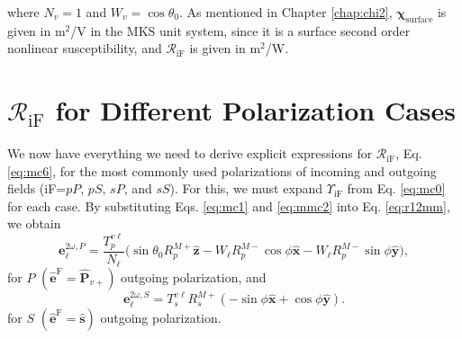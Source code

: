 where $N_{v}=1$ and $W_{v}=\cos\theta_{0}$. As mentioned in Chapter
\eqref{chap:chi2}, $\boldsymbol{\chi}_{\mathrm{surface}}$ is given in m$^{2}$/V
in the MKS unit system, since it is a surface second order nonlinear
susceptibility, and $\mathcal{R}_{\mathrm{iF}}$ is given in m$^2$/W.



\section{\texorpdfstring{$\mathcal{R}_{\mathrm{iF}}$}{R} for Different
Polarization Cases}\label{sec:rcases}

We now have everything we need to derive explicit expressions for
$\mathcal{R}_{\mathrm{iF}}$, Eq. \eqref{eq:mc6}, for the most commonly used
polarizations of incoming and outgoing fields (iF=$pP$, $pS$, $sP$, and $sS$).
For this, we must expand $\Upsilon_{\mathrm{iF}}$ from Eq. \eqref{eq:mc0} for
each case. By substituting Eqs. \eqref{eq:mc1} and \eqref{eq:mmc2} into Eq.
\eqref{eq:r12mm}, we obtain
\begin{equation}\label{eq:e2wpmr}
\mathbf{e}^{2\omega,P}_{\ell} =
\frac{T^{v\ell}_{p}}{N_{\ell}}
\big(
  \sin\theta_{0}R^{M+}_{p}\hat{\mathbf{z}}
- W_{\ell}R^{M-}_{p}\cos\phi\hat{\mathbf{x}}
- W_{\ell}R^{M-}_{p}\sin\phi\hat{\mathbf{y}}
\big),
\end{equation}
for $P$ $(\hat{\mathbf{e}}^{\mathrm{F}} = \hat{\mathbf{P}}_{v+})$ outgoing
polarization, and
\begin{equation}\label{eq:e2wsmr}
\mathbf{e}^{2\omega,S}_{\ell} =
T_{s}^{v\ell}R^{M+}_{s}
\left(
- \sin\phi\hat{\mathbf{x}}
+ \cos\phi\hat{\mathbf{y}}
\right).
\end{equation}
for $S$ $(\hat{\mathbf{e}}^{\mathrm{F}}=\hat{\mathbf{s}})$ outgoing
polarization.

